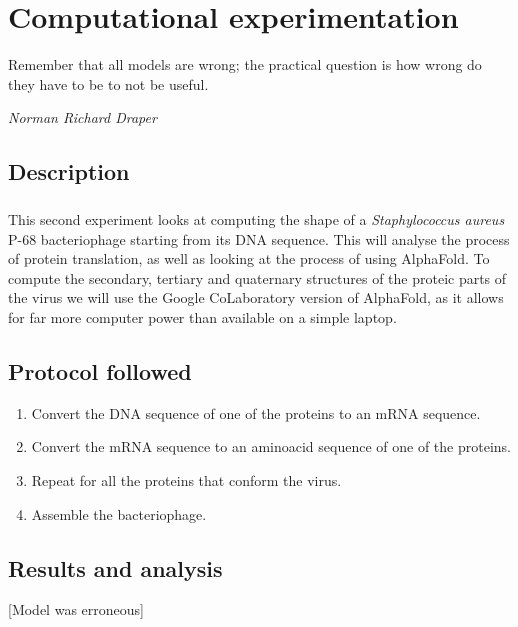 \chapter{Computational experimentation}
\epigraph{Remember that all models are wrong; the practical question is how wrong do they have to be to not be useful.}{\textit{Norman Richard Draper}}
\section{Description}
\paragraph{}This second experiment looks at computing the shape of a \emph{Staphylococcus aureus} P-68 bacteriophage starting from its DNA sequence. This will analyse the process of protein translation, as well as looking at the process of using AlphaFold\cite{jumperHighlyAccurateProtein2021}. To compute the secondary, tertiary and quaternary structures of the proteic parts of the virus we will use the Google CoLaboratory version of AlphaFold\cite{GoogleColaboratoryAlpha1970}, as it allows for far more computer power than available on a simple laptop.
\section{Protocol followed}
\begin{enumerate}[label=\arabic*)]
\item Convert the DNA sequence of one of the proteins to an mRNA sequence.
\item Convert the mRNA sequence to an aminoacid sequence of one of the proteins.
\item Repeat for all the proteins that conform the virus.
\item Assemble the bacteriophage.
\end{enumerate}
\section{Results and analysis}
[Model was erroneous]